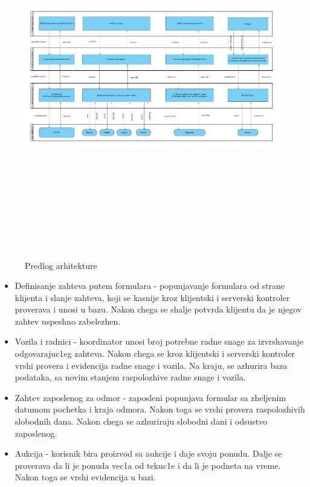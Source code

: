 \documentclass[10 pt]{article}
\begin{document}
		\begin{figure}[H]
			\centering
			\includegraphics[width=15cm,height=15cm,keepaspectratio]{slike/arhitektura.png}\\
			\caption{Predlog arhitekture}
			\label{fig:Arhitektura}
		\end{figure}
	
		\begin{itemize}
			\item Definisanje zahteva putem formulara - popunjavanje formulara od strane klijenta i slanje zahteva, koji se kasnije kroz klijent{s}ki i serverski kontroler proverava i unosi u bazu. Nakon chega se shalje potvrda klijentu da je njegov zahtev uspeshno zabelezhen.
			\item Vozila i radnici - koordinator unosi broj potrebne radne snage za izvrshavanje odgovarajuc1eg zahteva. Nakon chega se kroz klijent{s}ki i serverski kontroler vrshi provera i evidencija radne snage i vozila. Na kraju, se azhurira baza podataka, sa novim stanjem raspolozhive radne snage i vozila.
			\item Zahtev zaposlenog za odmor - zaposleni popunjava formular sa zheljenim datumom pochetka i kraja odmora. Nakon toga se vrshi provera raspolozhivih slobodnih dana. Nakon chega se azhuriraju slobodni dani i odsustvo zaposlenog.
			\item Aukcija - korisnik bira proizvod sa aukcije i daje svoju ponudu. Dalje se proverava da li je ponuda vec1a od tekuc1e i da li je podneta na vreme. Nakon toga se vrshi evidencija u bazi.
		\end{itemize}
	
	
	
\end{document}
